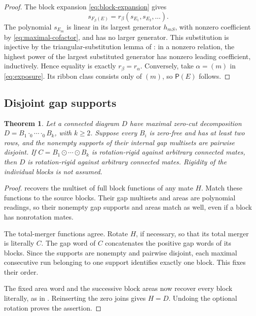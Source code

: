 \documentclass[11pt,a4paper]{amsart}
\numberwithin{equation}{section}
\theoremstyle{plain}
\newtheorem{theorem}{Theorem}[section]
\theoremstyle{definition}
\begin{document}
\begin{proof}
The block expansion \eqref{eq:block-expansion} gives
\[
 s_{F_\beta(E)}=r_\beta(s_{E_1},s_{E_2},\ldots).
\]
The polynomial \(s_{E_m}\) is linear in its largest generator \(h_{mS}\), with nonzero coefficient by \eqref{eq:maximal-cofactor}, and has no larger generator.  This substitution is injective by the triangular-substitution lemma of \cite{Shields2026Inflation}: in a nonzero relation, the highest power of the largest substituted generator has nonzero leading coefficient, inductively.  Hence equality is exactly \(r_\beta=r_\alpha\).  Conversely, take \(\alpha=(m)\) in \eqref{eq:exposure}.  Its ribbon class consists only of \((m)\), so \(\mathsf P(E)\) follows.
\end{proof}

\subsection{Disjoint gap supports}

\begin{theorem}\label{thm:separated-support}
Let a connected diagram \(D\) have maximal zero-cut decomposition \(D=B_1\cdot_0\cdots\cdot_0B_k\), with \(k\ge2\).  Suppose every \(B_i\) is zero-free and has at least two rows, and the nonempty supports of their internal gap multisets are pairwise disjoint.  If \(C=B_1\odot\cdots\odot B_k\) is rotation-rigid against arbitrary connected mates, then \(D\) is rotation-rigid against arbitrary connected mates.  Rigidity of the individual blocks is not assumed.
\end{theorem}
\begin{proof}
 recovers the multiset of full block functions of any mate \(H\).  Match these functions to the source blocks.  Their gap multisets and areas are polynomial readings, so their nonempty gap supports and areas match as well, even if a block has nonrotation mates.

The total-merger functions agree.  Rotate \(H\), if necessary, so that its total merger is literally \(C\).  The gap word of \(C\) concatenates the positive gap words of its blocks.  Since the supports are nonempty and pairwise disjoint, each maximal consecutive run belonging to one support identifies exactly one block.  This fixes their order.

The fixed area word and the successive block areas now recover every block literally, as in .  Reinserting the zero joins gives \(H=D\).  Undoing the optional rotation proves the assertion.
\end{proof}
\end{document}
